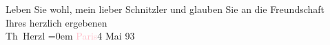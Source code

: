 \pstart
           Leben Sie wohl, mein lieber Schnitzler und glauben Sie an die Freundschaft
               {\\[\baselineskip]}Ihres herzlich ergebenen {\\[\baselineskip]}\spacefill\mbox{Th Herzl}\pend
           \leftskip=0em{}
\pstart
           \textcolor{pink}{Paris}\ledrightnote{\textcolor{pink}{Paris}}{ }4 Mai 93\pend
           \endnumbering{}
\begin{anhang}
\end{anhang}\newcommand{\dateiname}{L03827}\newcommand{\titel}{Theodor Herzl an Arthur Schnitzler, 4. 5. 1893}\newcommand{\editorInnen}{Selma Jahnke und Martin Anton Müller}
